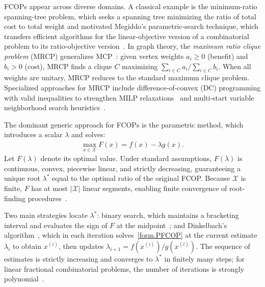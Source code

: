 FCOPs appear across diverse domains. A classical example is the minimum-ratio spanning-tree problem, which seeks a spanning tree minimizing the
ratio of total cost to total weight and motivated Megiddo's parametric-search technique, which transfers efficient algorithms for the linear-objective version of a combinatorial problem to its ratio-objective version~\citep{Chandrasekaran1977, megiddo1979combinatorial, Megiddo1983, skiscim2004complexity, ursulenko2013global}. In graph
theory, the \emph{maximum ratio clique problem} (MRCP) generalizes MCP~\citep{Sethuraman2015ratioclq}:
given vertex weights $a_i \ge 0$ (benefit) and $b_i > 0$ (cost), MRCP
finds a clique $C$ maximizing $\sum_{i\in C} a_i / \sum_{i\in C}
b_i$. When all weights are unitary,
MRCP reduces to the standard maximum clique problem. Specialized
approaches for MRCP include difference-of-convex (DC) programming with
valid inequalities to strengthen MILP relaxations~\citep{moeini2015}
and multi-start variable neighborhood search
heuristics~\citep{GOEKE2017283}.

The dominant generic approach for FCOPs is the parametric method,
which introduces a scalar $\lambda$ and solves:
\begin{align}
    \label{form.PFCOP}
    \max_{x \in \mathcal{X}} F(x) = f(x) - \lambda g(x).
\end{align}
Let $F(\lambda)$ denote its optimal value. Under standard assumptions,
$F(\lambda)$ is continuous, convex, piecewise linear, and strictly
decreasing, guaranteeing a unique root $\lambda^*$ equal to the
optimal ratio of the original FCOP. Because $\mathcal{X}$ is finite,
$F$ has at most $|\mathcal{X}|$ linear segments, enabling finite
convergence of root-finding procedures~\citep{schaible1983fractional,
Hashizume1987, grunspan1973hyperbolic, robillard1971hyperbolic}.

Two main strategies locate $\lambda^*$: binary search, which maintains
a bracketing interval and evaluates the sign of $F$ at the
midpoint~\citep{Radzik2009}; and Dinkelbach's
algorithm~\citep{dinkelbach1967nonlinear}, which in each iteration
solves~\eqref{form.PFCOP} at the current estimate $\lambda_i$ to
obtain $x^{(i)}$, then updates
$\lambda_{i+1} = f(x^{(i)}) / g(x^{(i)})$. The sequence of estimates
is strictly increasing and converges to $\lambda^*$ in finitely many
steps; for linear fractional combinatorial problems, the number of
iterations is strongly polynomial~\citep{radzik1998fractional}.

